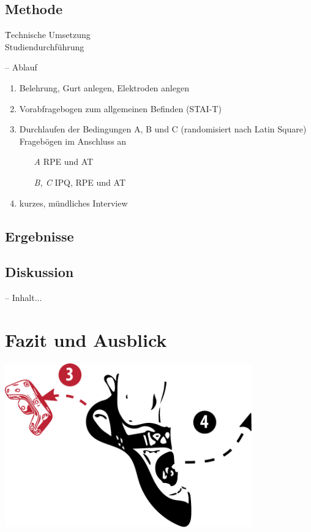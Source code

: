 \subsection{Methode}

\begin{frame}[standout]
\begin{center}
			\parbox{0cm}{%
		\LARGE
		\begin{tabbing}
			 \quad \= Technische Umsetzung\\
			 \> Studiendurchführung
		\end{tabbing}}
\end{center}
\end{frame}

\begin{frame}{\currentname{} -- Ablauf}
	\begin{enumerate}[label=\textbf\textcolor{tertiary}{\theenumi}]
		\item Belehrung, Gurt anlegen, Elektroden anlegen
		\item Vorabfragebogen zum allgemeinen Befinden (STAI-T)
		\item Durchlaufen der Bedingungen A, B und C (randomisiert nach Latin Square)
		\\Fragebögen im Anschluss an
		\begin{itemize}
			\item[\textit{A}] \gls{RPE} und \gls{AT}
			\item[\textit{B, C}] \gls{IPQ}, \gls{RPE} und \gls{AT}
		\end{itemize}
		\item kurzes, mündliches Interview
	\end{enumerate}
\end{frame}

\subsection{Ergebnisse}
\subsection{Diskussion}

\begin{frame}{\currentname{} -- }
	Inhalt...
\end{frame}

\section{Fazit und Ausblick}

\begin{frame}[plain]
\begin{center}
	\includegraphics[width=0.8\textwidth]{include/images/climbing-shoe-with-instructions-off.pdf}
\end{center}
\end{frame}
